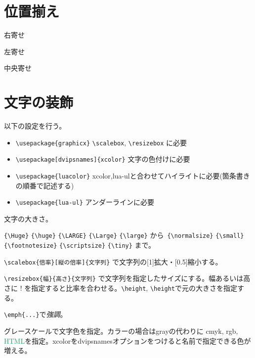 \documentclass[draft]{jlreq} %
\begin{document}
\section{位置揃え}

\begin{flushright}
 右寄せ
\end{flushright}

\begin{flushleft}
 左寄せ
\end{flushleft}

\begin{center}
 中央寄せ
\end{center}

\section{文字の装飾}

以下の設定を行う。
\begin{itemize}
 \item \verb|\usepackage{graphicx}| \verb|\scalebox|, \verb|\resizebox| に必要
 \item \verb|\usepackage[dvipsnames]{xcolor}| 文字の色付けに必要
 \item \verb|\usepackage{luacolor}| xcolor,lua-ulと合わせてハイライトに必要(箇条書きの順番で記述する)
 \item \verb|\usepackage{lua-ul}| アンダーラインに必要
\end{itemize}

文字の大きさ。

\verb|{\Huge}| \verb|{\huge}| \verb|{\LARGE}| \verb|{\Large}| \verb|{\large}| から\
\verb|{\normalsize}| \verb|{\small}| \verb|{\footnotesize}| \verb|{\scriptsize}| \verb|{\tiny}| まで。

\verb|\scalebox{倍率}[縦の倍率]{文字列}| で文字列の\scalebox{2}[1]{拡大}・\scalebox{1}[0.5]{縮小}する。

\verb|\resizebox{幅}{高さ}{文字列}| で文字列を指定したサイズにする。幅あるいは高さに ! を指定すると比率を合わせる。\verb|\height|, \verb|\height|で元の大きさを指定する。

\verb|\emph{...}|で\emph{強調}。

グレースケールで\textcolor[gray]{0.7}{文字色}を指定。カラーの場合はgrayの代わりに
\textcolor[cmyk]{0.75,0,0.65,0}{cmyk},
\textcolor[rgb]{1.0,0.6,0.4}{rgb},
\textcolor[HTML]{25A16B}{HTML}を指定。xcolorをdvipsnamesオプションをつけると名前で指定できる色が増える。
\end{document}
